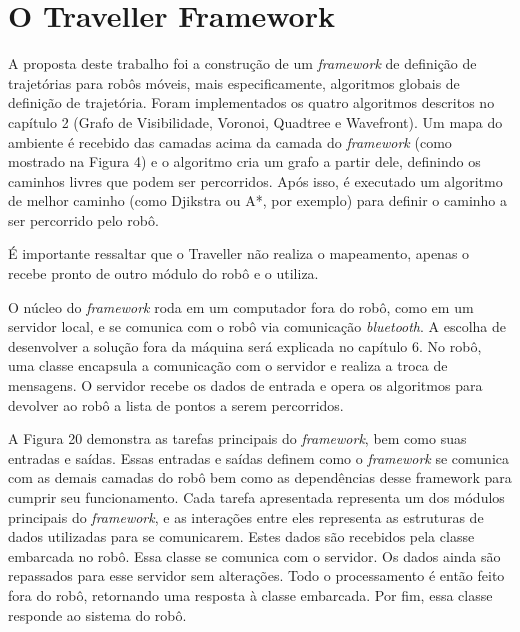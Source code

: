 \chapter[O Traveller Framework]{O Traveller Framework}

A proposta deste trabalho foi a construção de um \textit{framework} de definição de trajetórias para robôs móveis, mais especificamente, algoritmos globais de definição de trajetória. Foram implementados os quatro algoritmos descritos no capítulo 2 (Grafo de Visibilidade, Voronoi, Quadtree e Wavefront). Um mapa do ambiente é recebido das camadas acima da camada do \textit{framework} (como mostrado na Figura 4) e o algoritmo cria um grafo a partir dele, definindo os caminhos livres que podem ser percorridos. Após isso, é executado um algoritmo de melhor caminho (como Djikstra ou A*, por exemplo) para definir o caminho a ser percorrido pelo robô.

É importante ressaltar que o Traveller não realiza o mapeamento, apenas o recebe pronto de outro módulo do robô e o utiliza.

O núcleo do \textit{framework} roda em um computador fora do robô, como em um servidor local, e se comunica com o robô via comunicação \textit{bluetooth}. A escolha de desenvolver a solução fora da máquina será explicada no capítulo 6. No robô, uma classe encapsula a comunicação com o servidor e realiza a troca de mensagens. O servidor recebe os dados de entrada e opera os algoritmos para devolver ao robô a lista de pontos a serem percorridos.

A Figura 20 demonstra as tarefas principais do \textit{framework}, bem como suas entradas e saídas. Essas entradas e saídas definem como o \textit{framework} se comunica com as demais camadas do robô bem como as dependências desse framework para cumprir seu funcionamento. Cada tarefa apresentada representa um dos módulos principais do \textit{framework}, e as interações entre eles representa as estruturas de dados utilizadas para se comunicarem. Estes dados são recebidos pela classe embarcada no robô. Essa classe se comunica com o servidor. Os dados ainda são repassados para esse servidor sem alterações. Todo o processamento é então feito fora do robô, retornando uma resposta à classe embarcada. Por fim, essa classe responde ao sistema do robô.
 
